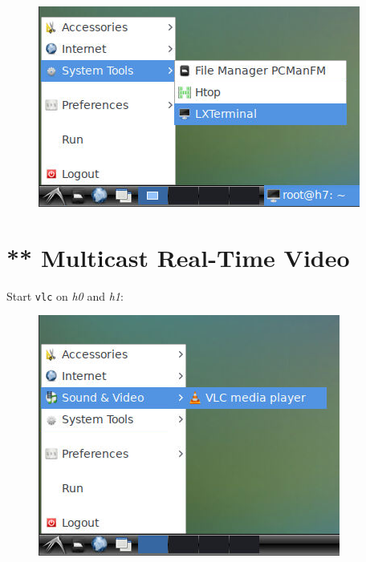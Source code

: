 \documentclass{../UTNetLab}
\begin{document}
\begin{figure}[H]
    \centering
    \includegraphics[scale=2.0]{img/terminal}
\end{figure}

\section{** Multicast Real-Time Video}
Start \lstinline{vlc} on \textit{h0} and \textit{h1}:
\begin{figure}[H]
    \centering
    \includegraphics[scale=2.0]{img/vlc-open}
\end{figure}
\end{document}
